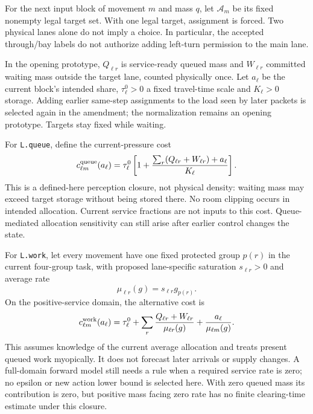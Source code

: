 \documentclass[11pt]{article}
\begin{document}
For the next input block of movement $m$ and mass $q$, let $\mathcal A_m$ be its fixed nonempty legal target set. With one legal target, assignment is forced. Two physical lanes alone do not imply a choice. In particular, the accepted through/bay labels do not authorize adding left-turn permission to the main lane.

In the opening prototype, $Q_{\ell r}$ is service-ready queued mass and $W_{\ell r}$ committed waiting mass outside the target lane, counted physically once. Let $a_\ell$ be the current block's intended share, $\tau^0_\ell>0$ a fixed travel-time scale and $K_\ell>0$ storage. Adding earlier same-step assignments to the load seen by later packets is selected again in the amendment; the normalization remains an opening prototype. Targets stay fixed while waiting.

For \texttt{L.queue}, define the current-pressure cost
\begin{equation}
 c^{\rm queue}_{\ell m}(a_\ell)=\tau^0_\ell
 \left[1+\frac{\sum_r(Q_{\ell r}+W_{\ell r})+a_\ell}{K_\ell}\right].
 \label{eq:queuecost}
\end{equation}
This is a defined-here perception closure, not physical density: waiting mass may exceed target storage without being stored there. No room clipping occurs in intended allocation. Current service fractions are not inputs to this cost. Queue-mediated allocation sensitivity can still arise after earlier control changes the state.

For \texttt{L.work}, let every movement have one fixed protected group $p(r)$ in the current four-group task, with proposed lane-specific saturation $s_{\ell r}>0$ and average rate
\begin{equation}
 \mu_{\ell r}(g)=s_{\ell r}g_{p(r)}.
\end{equation}
On the positive-service domain, the alternative cost is
\begin{equation}
 c^{\rm work}_{\ell m}(a_\ell)=\tau^0_\ell+
 \sum_r\frac{Q_{\ell r}+W_{\ell r}}{\mu_{\ell r}(g)}
 +\frac{a_\ell}{\mu_{\ell m}(g)}.
 \label{eq:workcost}
\end{equation}
This assumes knowledge of the current average allocation and treats present queued work myopically. It does not forecast later arrivals or supply changes. A full-domain forward model still needs a rule when a required service rate is zero; no epsilon or new action lower bound is selected here. With zero queued mass its contribution is zero, but positive mass facing zero rate has no finite clearing-time estimate under this closure.
\end{document}
